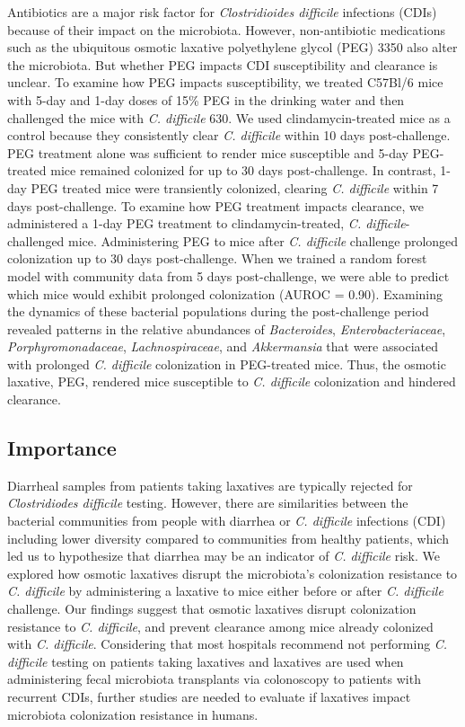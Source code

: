 \documentclass[
  11pt,
]{article}
\begin{document}
Antibiotics are a major risk factor for \emph{Clostridioides difficile}
infections (CDIs) because of their impact on the microbiota. However,
non-antibiotic medications such as the ubiquitous osmotic laxative
polyethylene glycol (PEG) 3350 also alter the microbiota. But whether
PEG impacts CDI susceptibility and clearance is unclear. To examine how
PEG impacts susceptibility, we treated C57Bl/6 mice with 5-day and 1-day
doses of 15\% PEG in the drinking water and then challenged the mice
with \emph{C. difficile} 630. We used clindamycin-treated mice as a
control because they consistently clear \emph{C. difficile} within 10
days post-challenge. PEG treatment alone was sufficient to render mice
susceptible and 5-day PEG-treated mice remained colonized for up to 30
days post-challenge. In contrast, 1-day PEG treated mice were
transiently colonized, clearing \emph{C. difficile} within 7 days
post-challenge. To examine how PEG treatment impacts clearance, we
administered a 1-day PEG treatment to clindamycin-treated, \emph{C.
difficile}-challenged mice. Administering PEG to mice after \emph{C.
difficile} challenge prolonged colonization up to 30 days
post-challenge. When we trained a random forest model with community
data from 5 days post-challenge, we were able to predict which mice
would exhibit prolonged colonization (AUROC = 0.90). Examining the
dynamics of these bacterial populations during the post-challenge period
revealed patterns in the relative abundances of \emph{Bacteroides},
\emph{Enterobacteriaceae}, \emph{Porphyromonadaceae},
\emph{Lachnospiraceae}, and \emph{Akkermansia} that were associated with
prolonged \emph{C. difficile} colonization in PEG-treated mice. Thus,
the osmotic laxative, PEG, rendered mice susceptible to \emph{C.
difficile} colonization and hindered clearance.

\hypertarget{importance}{%
\subsection{Importance}\label{importance}}

Diarrheal samples from patients taking laxatives are typically rejected
for \emph{Clostridiodes difficile} testing. However, there are
similarities between the bacterial communities from people with diarrhea
or \emph{C. difficile} infections (CDI) including lower diversity
compared to communities from healthy patients, which led us to
hypothesize that diarrhea may be an indicator of \emph{C. difficile}
risk. We explored how osmotic laxatives disrupt the microbiota's
colonization resistance to \emph{C. difficile} by administering a
laxative to mice either before or after \emph{C. difficile} challenge.
Our findings suggest that osmotic laxatives disrupt colonization
resistance to \emph{C. difficile}, and prevent clearance among mice
already colonized with \emph{C. difficile}. Considering that most
hospitals recommend not performing \emph{C. difficile} testing on
patients taking laxatives and laxatives are used when administering
fecal microbiota transplants via colonoscopy to patients with recurrent
CDIs, further studies are needed to evaluate if laxatives impact
microbiota colonization resistance in humans.
\end{document}

